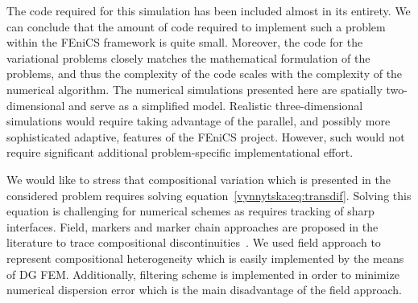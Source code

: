 The code required for this simulation has been included almost in its
entirety. We can conclude that the amount of code required to
implement such a problem within the FEniCS framework is quite
small. Moreover, the code for the variational problems closely matches
the mathematical formulation of the problems, and thus the complexity
of the code scales with the complexity of the numerical algorithm.
The numerical simulations presented here are spatially two-dimensional
and serve as a simplified model. Realistic three-dimensional
simulations would require taking advantage of the parallel, and
possibly more sophisticated adaptive, features of the FEniCS
project. However, such would not require significant additional
problem-specific implementational effort.

We would like to stress that compositional variation which is
presented in the considered problem requires solving
equation~\eqref{vynnytska:eq:transdif}.  Solving this equation is
challenging for numerical schemes as requires tracking of sharp
interfaces.  Field, markers and marker chain approaches are proposed
in the literature to trace compositional
discontinuities~\citep{IsmailZadehTackley2010}. We used field approach
to represent compositional heterogeneity which is easily implemented
by the means of DG FEM. Additionally, filtering scheme is implemented
in order to minimize numerical dispersion error which is the main
disadvantage of the field approach.


